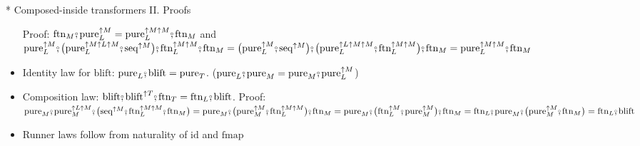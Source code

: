 \documentclass[english]{beamer}
\newcommand{\bef}{\ensuremath\raisebox{2pt}{$\mathsmaller{\mathsmaller{\circ}}$}\hspace{-3.3pt},}
\begin{document}
\begin{frame}{{*} Composed-inside transformers II. Proofs}
\begin{itemize}
{\footnotesize{}Proof: $\text{ftn}_{M}\bef\text{pure}_{L}^{\uparrow M}=\text{pure}_{L}^{\uparrow M\uparrow M}\bef\text{ftn}_{M}$
and $\text{pure}_{L}^{\uparrow M}\bef\big(\text{pure}_{L}^{\uparrow M\uparrow L\uparrow M}\bef\text{seq}^{\uparrow M}\big)\bef\text{ftn}_{L}^{\uparrow M\uparrow M}\bef\text{ftn}_{M}=\big(\text{pure}_{L}^{\uparrow M}\bef\text{seq}^{\uparrow M}\big)\bef\big(\text{pure}_{L}^{\uparrow L\uparrow M\uparrow M}\bef\text{ftn}_{L}^{\uparrow M\uparrow M}\big)\bef\text{ftn}_{M}=\text{pure}_{L}^{\uparrow M\uparrow M}\bef\text{ftn}_{M}$}{\footnotesize\par}
\item Identity law for $\text{blift}$: $\text{pure}_{L}\bef\text{blift}=\text{pure}_{T}$.{\footnotesize{}
($\text{pure}_{L}\bef\text{pure}_{M}=\text{pure}_{M}\bef\text{pure}_{L}^{\uparrow M}$)}{\footnotesize\par}
\item Composition law: $\text{blift}\bef\text{blift}^{\uparrow T}\bef\text{ftn}_{T}=\text{ftn}_{L}\bef\text{blift}$.
{\footnotesize{}Proof: $\text{pure}_{M}\bef\text{pure}_{M}^{\uparrow L\uparrow M}\bef\big(\text{seq}^{\uparrow M}\bef\text{ftn}_{L}^{\uparrow M\uparrow M}\bef\text{ftn}_{M}\big)=\text{pure}_{M}\bef\big(\text{pure}_{M}^{\uparrow M}\bef\text{ftn}_{L}^{\uparrow M\uparrow M}\big)\bef\text{ftn}_{M}=\text{pure}_{M}\bef\big(\text{ftn}_{L}^{\uparrow M}\bef\text{pure}_{M}^{\uparrow M}\big)\bef\text{ftn}_{M}=\text{ftn}_{L}\bef\text{pure}_{M}\bef\big(\text{pure}_{M}^{\uparrow M}\bef\text{ftn}_{M}\big)=\text{ftn}_{L}\bef\text{blift}$}{\footnotesize\par}
\item Runner laws follow from naturality of $\text{id}$ and $\text{fmap}$ 
\end{itemize}
\end{frame}
\end{document}

